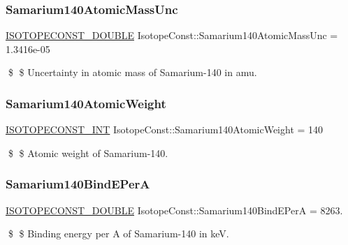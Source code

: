 \subsubsection{\texorpdfstring{Samarium140\+Atomic\+Mass\+Unc}{Samarium140AtomicMassUnc}}
{\footnotesize\ttfamily \mbox{\hyperlink{group___isotope_const-_macros_ga8f45a7272ce02c0b4c65c44636ed719a}{I\+S\+O\+T\+O\+P\+E\+C\+O\+N\+S\+T\+\_\+\+D\+O\+U\+B\+LE}} Isotope\+Const\+::\+Samarium140\+Atomic\+Mass\+Unc = 1.\+3416e-\/05}

\$ \$ Uncertainty in atomic mass of Samarium-\/140 in amu. \mbox{\label{group___isotope_const-_samarium-_sm140_gabfcd9d093edf084a06b35dc354c4f2a0}} 
\subsubsection{\texorpdfstring{Samarium140\+Atomic\+Weight}{Samarium140AtomicWeight}}
{\footnotesize\ttfamily \mbox{\hyperlink{group___isotope_const-_macros_ga5f18360b3e99483a35c32d789e62621c}{I\+S\+O\+T\+O\+P\+E\+C\+O\+N\+S\+T\+\_\+\+I\+NT}} Isotope\+Const\+::\+Samarium140\+Atomic\+Weight = 140}

\$ \$ Atomic weight of Samarium-\/140. \mbox{\label{group___isotope_const-_samarium-_sm140_ga9bbc37ed45b0345ac2de62a414617c07}} 
\subsubsection{\texorpdfstring{Samarium140\+Bind\+E\+PerA}{Samarium140BindEPerA}}
{\footnotesize\ttfamily \mbox{\hyperlink{group___isotope_const-_macros_ga8f45a7272ce02c0b4c65c44636ed719a}{I\+S\+O\+T\+O\+P\+E\+C\+O\+N\+S\+T\+\_\+\+D\+O\+U\+B\+LE}} Isotope\+Const\+::\+Samarium140\+Bind\+E\+PerA = 8263.}

\$ \$ Binding energy per A of Samarium-\/140 in keV. \mbox{\label{group___isotope_const-_samarium-_sm140_ga7d6d99ddb5581014dde6da96c97961b9}} 
